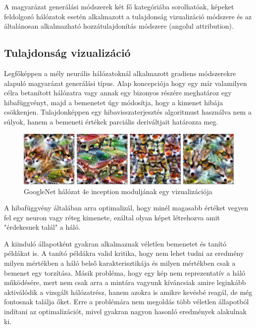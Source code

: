 A magyarázat generálási módszerek két fő kategóriába sorolhatóak, képeket feldolgozó hálózatok esetén alkalmazott a tulajdonság vizualizáció módszere és az általánosan alkalmazható hozzátulajdonítás módszere (angolul \foreignlanguage{english}{attribution}). 

\subsection{Tulajdonság vizualizáció}

Legfőképpen a mély neurális hálózatoknál alkalmazott gradiens módszerekre alapuló magyarázat generálási típus. Alap koncepciója hogy egy már valamilyen célra betanított hálózatra vagy annak egy bizonyos részére meghatároz egy hibafüggvényt, majd a bemenetet úgy módosítja, hogy a kimenet hibája csökkenjen. Tulajdonképpen egy hibavisszaterjesztés algoritmust használva nem a súlyok, hanem a bemeneti értékek parciális deriváltjait határozza meg.

\begin{figure}[H]
    \centering
    \includegraphics[width=\linewidth]{figures/feature_visualization.png}
    \caption{GoogleNet hálózat 4e inception moduljának egy vizualizációja}
    \label{fig:featurevisualization}
\end{figure}

A hibafüggvény általában arra optimalizál, hogy minél magasabb értéket vegyen fel egy neuron vagy réteg kimenete, ezáltal olyan képet létrehozva amit "érdekesnek talál" a háló.

A kiinduló állapotként gyakran alkalmaznak véletlen bemenetet és tanító példákat is. A tanító példákra valid kritika, hogy nem lehet tudni az eredmény milyen mértékben a háló belső karakterisztikája és milyen mértékben csak a bemenet egy torzítása. Másik probléma, hogy egy kép nem reprezentatív a háló működésére, mert nem csak arra a mintára vagyunk kíváncsiak amire leginkább aktiválódik a vizsgált hálózatrész, hanem azokra is amikre kevésbé reagál, de még fontosnak találja őket. Erre a problémára nem megoldás több véletlen állapotból indítani az optimalizációt, mivel gyakran nagyon hasonló eredmények alakulnak ki. 

